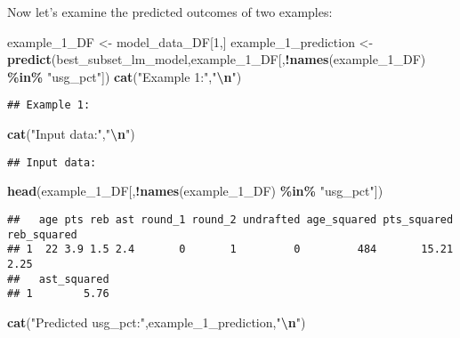 \documentclass[
]{article}
\newenvironment{Shaded}{\begin{snugshade}}{\end{snugshade}}
\newcommand{\DecValTok}[1]{\textcolor[rgb]{0.00,0.00,0.81}{#1}}
\newcommand{\FunctionTok}[1]{\textcolor[rgb]{0.13,0.29,0.53}{\textbf{#1}}}
\newcommand{\NormalTok}[1]{#1}
\newcommand{\OtherTok}[1]{\textcolor[rgb]{0.56,0.35,0.01}{#1}}
\newcommand{\SpecialCharTok}[1]{\textcolor[rgb]{0.81,0.36,0.00}{\textbf{#1}}}
\newcommand{\StringTok}[1]{\textcolor[rgb]{0.31,0.60,0.02}{#1}}
\begin{document}
Now let's examine the predicted outcomes of two examples:

\begin{Shaded}
\begin{Highlighting}[]
\NormalTok{example\_1\_DF }\OtherTok{\textless{}{-}}\NormalTok{ model\_data\_DF[}\DecValTok{1}\NormalTok{,]}
\NormalTok{example\_1\_prediction }\OtherTok{\textless{}{-}} 
  \FunctionTok{predict}\NormalTok{(best\_subset\_lm\_model,example\_1\_DF[,}\SpecialCharTok{!}\FunctionTok{names}\NormalTok{(example\_1\_DF) }\SpecialCharTok{\%in\%} \StringTok{"usg\_pct"}\NormalTok{])}
\FunctionTok{cat}\NormalTok{(}\StringTok{"Example 1:"}\NormalTok{,}\StringTok{"}\SpecialCharTok{\textbackslash{}n}\StringTok{"}\NormalTok{)}
\end{Highlighting}
\end{Shaded}

\begin{verbatim}
## Example 1:
\end{verbatim}

\begin{Shaded}
\begin{Highlighting}[]
\FunctionTok{cat}\NormalTok{(}\StringTok{"Input data:"}\NormalTok{,}\StringTok{"}\SpecialCharTok{\textbackslash{}n}\StringTok{"}\NormalTok{)}
\end{Highlighting}
\end{Shaded}

\begin{verbatim}
## Input data:
\end{verbatim}

\begin{Shaded}
\begin{Highlighting}[]
\FunctionTok{head}\NormalTok{(example\_1\_DF[,}\SpecialCharTok{!}\FunctionTok{names}\NormalTok{(example\_1\_DF) }\SpecialCharTok{\%in\%} \StringTok{"usg\_pct"}\NormalTok{])}
\end{Highlighting}
\end{Shaded}

\begin{verbatim}
##   age pts reb ast round_1 round_2 undrafted age_squared pts_squared reb_squared
## 1  22 3.9 1.5 2.4       0       1         0         484       15.21        2.25
##   ast_squared
## 1        5.76
\end{verbatim}

\begin{Shaded}
\begin{Highlighting}[]
\FunctionTok{cat}\NormalTok{(}\StringTok{"Predicted usg\_pct:"}\NormalTok{,example\_1\_prediction,}\StringTok{"}\SpecialCharTok{\textbackslash{}n}\StringTok{"}\NormalTok{)}
\end{Highlighting}
\end{Shaded}
\end{document}
